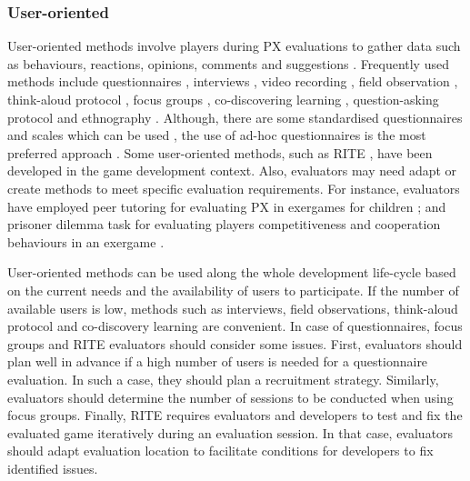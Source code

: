 \subsubsection{User-oriented}
User-oriented methods involve players during \ac{PX} evaluations to gather data such as behaviours, reactions, opinions, comments and suggestions \autocite{Yanez-Gomez2017,Bernhaupt2015,Drachen2013}. Frequently used methods include questionnaires \autocite{Yanez-Gomez2017,Ho2017,Wiemeyer2016,Nacke2015,Mueller2015,Bernhaupt2015,Zhao2016,Lapas2015,Nijhar2012,Nackea}, interviews \autocite{Wiemeyer2016,Moosajee,Nacke2015,Nijhar2012,Nackea}, video recording \autocite{Wiemeyer2016,Moosajee,Mueller2015,Nijhar2012}, field observation \autocite{Yanez-Gomez2017,Wiemeyer2016,Nacke2015}, think-aloud protocol \autocite{Wiemeyer2016,Nacke2015,desurvire_methods_2013}, focus groups \autocite{Yanez-Gomez2017,Nacke2015}, co-discovering learning \autocite{Yanez-Gomez2017}, question-asking protocol \autocite{Yanez-Gomez2017} and ethnography \autocite{Nackea}. Although, there are some standardised questionnaires and scales which can be used \autocite{denisova_convergence_2016,VandenAbeele2016,Calvillo-Gamez2015,Brockmyer2009,Poels2008,DeKort2007,Vorderer2004}, the use of ad-hoc questionnaires is the most preferred approach \autocite{Yanez-Gomez2017}. Some user-oriented methods, such as \ac{RITE} \autocite{Moosajee,Nackea}, have been developed in the game development context. Also, evaluators may need adapt or create methods to meet specific evaluation requirements. For instance, evaluators have employed peer tutoring for evaluating \ac{PX} in exergames for children \autocite{Hoysniemi2003}; and prisoner dilemma task for evaluating players competitiveness and cooperation behaviours in an exergame \autocite{Mueller2015}.

User-oriented methods can be used along the whole development life-cycle based on the current needs and the availability of users to participate. If the number of available users is low, methods such as interviews, field observations, think-aloud protocol and co-discovery learning are convenient. In case of questionnaires, focus groups and \ac{RITE} evaluators should consider some issues. First, evaluators should plan well in advance if a high number of users is needed for a questionnaire evaluation. In such a case, they should plan a recruitment strategy. Similarly, evaluators should determine the number of sessions to be conducted when using focus groups. Finally, \ac{RITE} requires evaluators and developers to test and fix the evaluated game iteratively during an evaluation session. In that case, evaluators should adapt evaluation location to facilitate conditions for developers to fix identified issues.

